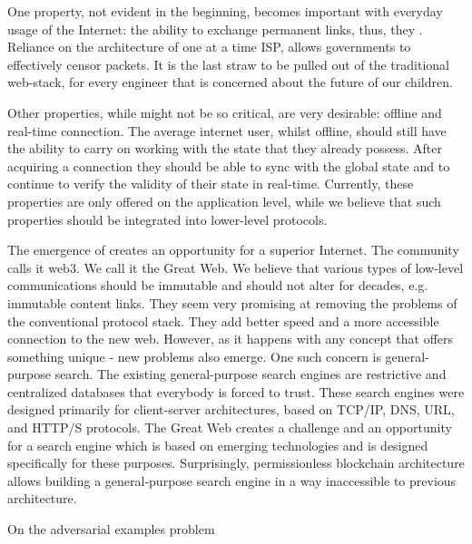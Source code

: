 \documentclass[8pt,oneside]{amsart}
\makeatletter
\newcommand{\linkgreen}[2]{\href{#1}{\color{green}{#2}}}
\renewcommand\subsection{\@startsection{subsection}
                                    {2}{\z@}
                                    {-3.25ex\@plus -1ex \@minus -.2ex}
                                    {0ex \@plus .2ex}
                                    {\play\Large}
                        }
\newcommand{\titleSection}[1]{\subsection{#1}}
\makeatother
\begin{document}
One property, not evident in the beginning, becomes important with everyday usage of the Internet: the ability to exchange permanent links, thus, they \linkgreen{https://ipfs.io/ipfs/QmNhaUrhM7KcWzFYdBeyskoNyihrpHvUEBQnaddwPZigcN}{would not break after time had passed}. Reliance on the architecture of one at a time ISP, allows governments to effectively censor packets. It is the last straw to be pulled out of the traditional web-stack, for every engineer that is concerned about the future of our children.

Other properties, while might not be so critical, are very desirable: offline and real-time connection. The average internet user, whilst offline, should still have the ability to carry on working with the state that they already possess. After acquiring a connection they should be able to sync with the global state and to continue to verify the validity of their state in real-time. Currently, these properties are only offered on the application level, while we believe that such properties should be integrated into lower-level protocols.

The emergence of \linkgreen{https://ipfs.io/ipfs/Qmf2rKkDPSsvdudwSmdDPbZuYae8XRV26c1wAFCCvg8Dhw}{a brand-new web-stack} creates an opportunity for a superior Internet. The community calls it web3. We call it the Great Web. We believe that various types of low-level communications should be immutable and should not alter for decades, e.g. immutable content links. They seem very promising at removing the problems of the conventional protocol stack. They add better speed and a more accessible connection to the new web. However, as it happens with any concept that offers something unique - new problems also emerge. One such concern is general-purpose search. The existing general-purpose search engines are restrictive and centralized databases that everybody is forced to trust. These search engines were designed primarily for client-server architectures, based on TCP/IP, DNS, URL, and HTTP/S protocols. The Great Web creates a challenge and an opportunity for a search engine which is based on emerging technologies and is designed specifically for these purposes. Surprisingly, permissionless blockchain architecture allows building a general-purpose search engine in a way inaccessible to previous architecture.

\titleSection{On the adversarial examples problem}\label{adversarial-examples}
\end{document}
